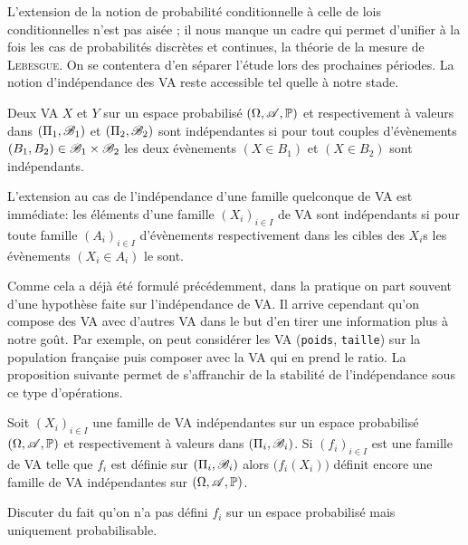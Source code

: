 \documentclass[11pt, a4paper]{article}
\begin{document}
L'extension de la notion de probabilité conditionnelle à celle de lois
conditionnelles n'est pas aisée ; il nous manque un cadre qui permet
d'unifier à la fois les cas de probabilités discrètes et continues, la
théorie de la mesure de \textsc{Lebesgue}. On se contentera d'en
séparer l'étude lors des prochaines périodes. La notion d'indépendance
des VA reste accessible tel quelle à notre stade.
\begin{defn}
  Deux VA $X$ et $Y$ sur un espace probabilisé $(\Omega, \mathscr{A}, \operatorname{\mathbb{P}})$
  et respectivement à valeurs dans $(\Pi_1, \mathscr{B}_1)$ et
  $(\Pi_2, \mathscr{B}_2)$ sont indépendantes si pour tout couples
  d'évènements $(B_1, B_2) \in \mathscr{B}_1\times \mathscr{B}_2$ les deux
  évènements $(X \in B_1)$ et $(X \in B_2)$ sont indépendants.

  L'extension au cas de l'indépendance d'une famille quelconque de VA
  est immédiate: les éléments d'une famille $(X_i)_{i \in I}$ de VA
  sont indépendants si pour toute famille $(A_i)_{i \in I}$
  d'évènements respectivement dans les cibles des $X_i$s les
  évènements $(X_i \in A_i)$ le sont.
\end{defn}
Comme cela a déjà été formulé précédemment, dans la pratique on part
souvent d'une hypothèse faite sur l'indépendance de VA. Il arrive
cependant qu'on compose des VA avec d'autres VA dans le but d'en tirer
une information plus à notre goût. Par exemple, on peut considérer les
VA (\texttt{poids}, \texttt{taille}) sur la population fran\c{c}aise
puis composer avec la VA qui en prend le ratio. La proposition
suivante permet de s'affranchir de la stabilité de l'indépendance sous
ce type d'opérations.
\begin{prop}
  Soit $(X_i)_{i \in I}$ une famille de VA indépendantes sur un espace
  probabilisé $(\Omega, \mathscr{A}, \operatorname{\mathbb{P}})$ et respectivement à valeurs dans
  $(\Pi_i, \mathscr{B}_i)$. Si $(f_i)_{i \in I}$ est une famille de VA
  telle que $f_i$ est définie sur $(\Pi_i, \mathscr{B}_i)$ alors
  $\big(f_i(X_i)\big)$ définit encore une famille de VA indépendantes
  sur $(\Omega, \mathscr{A}, \operatorname{\mathbb{P}})$.
\end{prop}
\begin{question}
  Discuter du fait qu'on n'a pas défini $f_i$ sur un espace
  probabilisé mais uniquement probabilisable.
\end{question}



\end{document}
